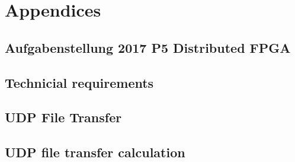 \chapter{Appendices}\label{chp:appendices}

\section{Aufgabenstellung 2017 P5 Distributed FPGA} \label{app:aufgabenstellung}


\section{Technicial requirements} \label{app:technicial_requirements}


\section{UDP File Transfer} \label{app:uftspec}


\section{UDP file transfer calculation} \label{app:uftcalc}

